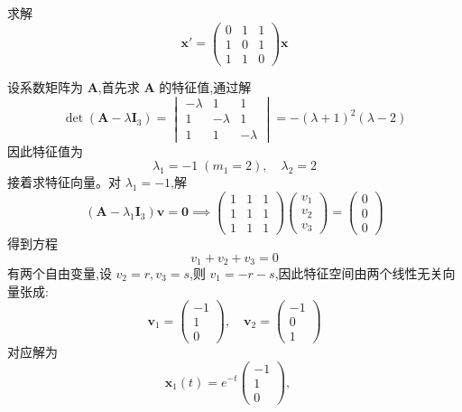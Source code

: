 \begin{questions}
    \question 求解 
    \[
    \boldsymbol{x}' = \begin{pmatrix} 0 & 1 & 1 \\ 1 & 0 & 1 \\ 1 & 1 & 0 \end{pmatrix} \boldsymbol{x}
    \]
    \begin{solution}
        设系数矩阵为 $\boldsymbol{A}$,首先求 $\boldsymbol{A}$ 的特征值,通过解
        \[
        \det(\boldsymbol{A} - \lambda \boldsymbol{I}_3) =  \begin{vmatrix} -\lambda & 1 & 1 \\ 1 & -\lambda & 1 \\ 1 & 1 & -\lambda \end{vmatrix} 
        = -(\lambda + 1)^2(\lambda - 2)
        \]
        因此特征值为
        \[
        \lambda_1 = -1 \;(m_1=2), \quad \lambda_2 = 2
        \]
        接着求特征向量。对 $\lambda_1 = -1$,解
        \[
        (\boldsymbol{A} - \lambda_1 \boldsymbol{I}_3) \boldsymbol{v} = \boldsymbol{0} \implies 
        \begin{pmatrix} 1 & 1 & 1 \\ 1 & 1 & 1 \\ 1 & 1 & 1 \end{pmatrix} \begin{pmatrix} v_1 \\ v_2 \\ v_3 \end{pmatrix} = \begin{pmatrix} 0 \\ 0 \\ 0 \end{pmatrix}
        \]
        得到方程
        \[
        v_1 + v_2 + v_3 = 0
        \]
        有两个自由变量,设 $v_2 = r, v_3 = s$,则 $v_1 = -r - s$,因此特征空间由两个线性无关向量张成:
        \[
        \boldsymbol{v}_1 = \begin{pmatrix}-1\\1\\0\end{pmatrix}, \quad \boldsymbol{v}_2 = \begin{pmatrix}-1\\0\\1\end{pmatrix}
        \]
        对应解为
        \[
        \boldsymbol{x}_1(t) = e^{-t} \begin{pmatrix}-1\\1\\0\end{pmatrix}, \quad 
\]
\end{solution}
\end{questions}
